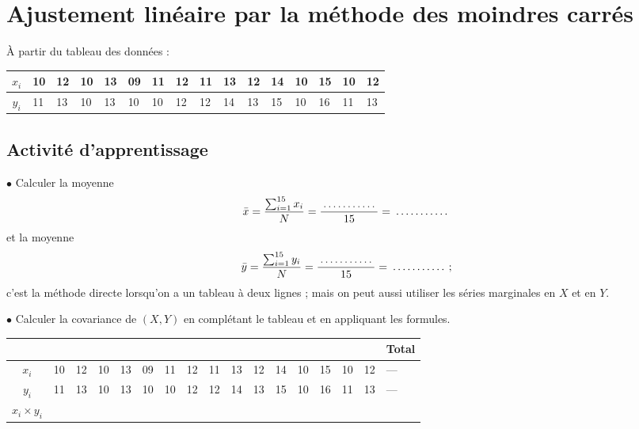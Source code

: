 \documentclass[11pt,a4paper]{article}
\newcommand{\blanc}[1][1.8cm]{\makebox[#1]{\dotfill}}
\newcommand{\barre}{---}
\begin{document}
\section{Ajustement linéaire par la méthode des moindres carrés}

À partir du tableau des données :

\begin{center}
  \small\setlength{\tabcolsep}{3pt}
  \begin{tabular}{|c|*{15}{C{0.62cm}|}}
    \hline
    $x_i$ & 10 & 12 & 10 & 13 & 09 & 11 & 12 & 11 & 13 & 12 & 14 & 10 & 15 & 10 & 12\\ \hline
    $y_i$ & 11 & 13 & 10 & 13 & 10 & 10 & 12 & 12 & 14 & 13 & 15 & 10 & 16 & 11 & 13\\ \hline
  \end{tabular}
\end{center}

\subsection{Activité d'apprentissage}

$\bullet$ Calculer la moyenne
\[
  \bar{x} = \frac{\sum_{i=1}^{15} x_i}{N} = \frac{\blanc}{15} = \blanc
\]
et la moyenne
\[
  \bar{y} = \frac{\sum_{i=1}^{15} y_i}{N} = \frac{\blanc}{15} = \blanc\,;
\]
c'est la méthode directe lorsqu'on a un tableau à deux lignes ; mais on peut
aussi utiliser les séries marginales en $X$ et en $Y$.

$\bullet$ Calculer la covariance de $(X,Y)$ en complétant le tableau et en
appliquant les formules.

\begin{center}
  \small\setlength{\tabcolsep}{3pt}
  \begin{tabular}{|c|*{15}{C{0.6cm}|}C{1.1cm}|}
     & Total\\ \hline
    $x_i$ & 10 & 12 & 10 & 13 & 09 & 11 & 12 & 11 & 13 & 12 & 14 & 10 & 15 & 10 & 12 & \barre\\ \hline
    $y_i$ & 11 & 13 & 10 & 13 & 10 & 10 & 12 & 12 & 14 & 13 & 15 & 10 & 16 & 11 & 13 & \barre\\ \hline
    $x_i \times y_i$ & & & & & & & & & & & & & & & & \\ \hline
  \end{tabular}
\end{center}
\end{document}
